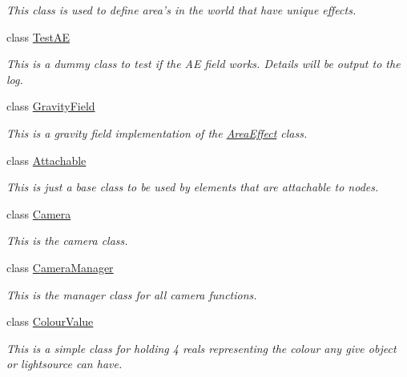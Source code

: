 \begin{DoxyCompactItemize}
\begin{DoxyCompactList}\small\item\em This class is used to define area's in the world that have unique effects. \item\end{DoxyCompactList}\item 
class \hyperlink{classphys_1_1TestAE}{TestAE}
\begin{DoxyCompactList}\small\item\em This is a dummy class to test if the AE field works. Details will be output to the log. \item\end{DoxyCompactList}\item 
class \hyperlink{classphys_1_1GravityField}{GravityField}
\begin{DoxyCompactList}\small\item\em This is a gravity field implementation of the \hyperlink{classphys_1_1AreaEffect}{AreaEffect} class. \item\end{DoxyCompactList}\item 
class \hyperlink{classphys_1_1Attachable}{Attachable}
\begin{DoxyCompactList}\small\item\em This is just a base class to be used by elements that are attachable to nodes. \item\end{DoxyCompactList}\item 
class \hyperlink{classphys_1_1Camera}{Camera}
\begin{DoxyCompactList}\small\item\em This is the camera class. \item\end{DoxyCompactList}\item 
class \hyperlink{classphys_1_1CameraManager}{CameraManager}
\begin{DoxyCompactList}\small\item\em This is the manager class for all camera functions. \item\end{DoxyCompactList}\item 
class \hyperlink{classphys_1_1ColourValue}{ColourValue}
\begin{DoxyCompactList}\small\item\em This is a simple class for holding 4 reals representing the colour any give object or lightsource can have. \item\end{DoxyCompactList}\item 

\end{DoxyCompactItemize}
